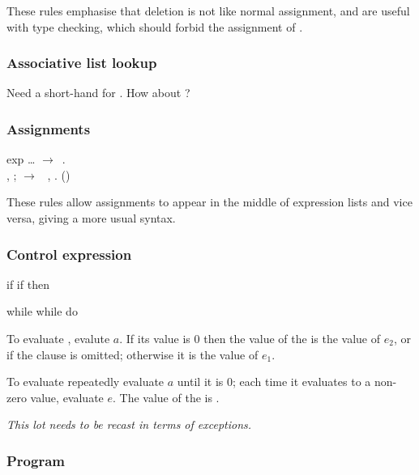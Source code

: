 \documentclass[english]{article}
\newcommand{\cont}{\noindent}
\newcommand{\goesto}{\ensuremath{\longrightarrow}}
\begin{document}
\cont These rules emphasise that deletion is not like normal assignment, and are useful with type checking, which should forbid the assignment of .

\subsubsection{Associative list lookup}

Need a short-hand for . How about ?

\subsubsection{Assignments}

\begin{bnfc}
\item[exp]\dots\Alt{} \goesto\ . \lbraceconc {}
\rbraceconc\Alt\\\lbraceconc {} , \pclosure ;  \rbraceconc
\goesto\ \lbraceconc {} , \pclosure \rbraceconc . ()
\end{bnfc}

\cont These rules allow assignments to appear in the middle of expression lists and vice versa, giving a more usual syntax.

\subsubsection{Control expression}

\begin{bnfc}
\item[if]if  then   
\item[while]while  do 
\end{bnfc}

\cont To evaluate , evalute $a$. If its value is 0 then the value of the  is the value of $e_2$, or  if the  clause is omitted; otherwise it is the value of $e_1$.

To evaluate  repeatedly evaluate $a$ until it is 0; each time it evaluates to a non-zero value, evaluate $e$. The value of the 
 is .

\emph{This lot needs to be recast in terms of exceptions.}

\subsubsection{Program}
\end{document}
